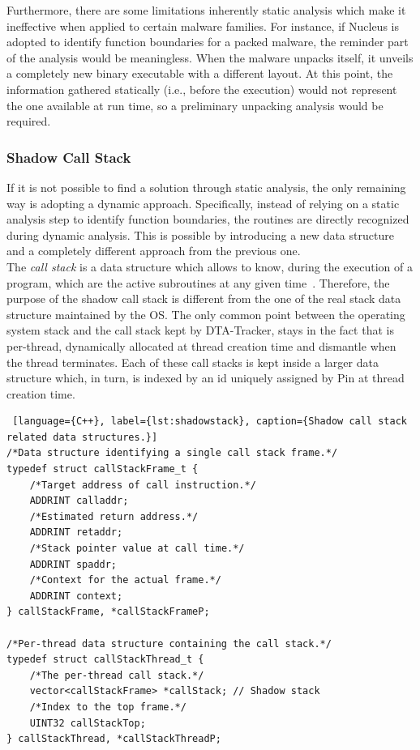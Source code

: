 \documentclass[LaM,binding=0.6cm]{sapthesis}
\begin{document}
Furthermore, there are some limitations inherently static analysis which make it ineffective when applied to certain malware families. For instance, if Nucleus is adopted to identify function boundaries for a packed malware, the reminder part of the analysis would be meaningless. When the malware unpacks itself, it unveils a completely new binary executable with a different layout. At this point, the information gathered statically (i.e., before the execution) would not represent the one available at run time, so a preliminary unpacking analysis would be required.

\subsubsection{Shadow Call Stack}
If it is not possible to find a solution through static analysis, the only remaining way is adopting a dynamic approach. Specifically, instead of relying on a static analysis step to identify function boundaries, the routines are directly recognized during dynamic analysis. This is possible by introducing a new data structure and a completely different approach from the previous one.\\

The \textit{call stack} is a data structure which allows to know, during the execution of a program, which are the active subroutines at any given time~\cite{de2018now}. Therefore, the purpose of the shadow call stack is different from the one of the real stack data structure maintained by the OS. The only common point between the operating system stack and the call stack kept by {\sf DTA-Tracker}, stays in the fact that is per-thread, dynamically allocated at thread creation time and dismantle when the thread terminates. Each of these call stacks is kept inside a larger data structure which, in turn, is indexed by an id uniquely assigned by Pin at thread creation time.

\begin{lstlisting} [language={C++}, label={lst:shadowstack}, caption={Shadow call stack related data structures.}]
/*Data structure identifying a single call stack frame.*/
typedef struct callStackFrame_t {
	/*Target address of call instruction.*/
	ADDRINT calladdr; 
	/*Estimated return address.*/
	ADDRINT retaddr;
	/*Stack pointer value at call time.*/
	ADDRINT spaddr;
	/*Context for the actual frame.*/
	ADDRINT context;
} callStackFrame, *callStackFrameP;

/*Per-thread data structure containing the call stack.*/
typedef struct callStackThread_t {
	/*The per-thread call stack.*/
	vector<callStackFrame> *callStack; // Shadow stack
	/*Index to the top frame.*/
	UINT32 callStackTop;
} callStackThread, *callStackThreadP;
\end{lstlisting}
\end{document}

